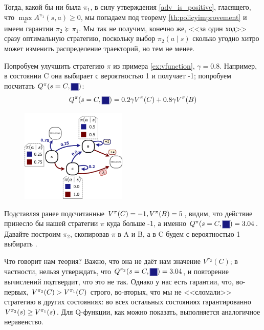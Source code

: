 Тогда, какой бы ни была $\pi_1$, в силу утверждения \ref{adv_is_positive}, гласящего, что $\max\limits_a A^{\pi_1}(s, a) \ge 0$, мы попадаем под теорему \ref{th:policyimprovement} и имеем гарантии $\pi_2 \succeq \pi_1$. Мы так не получим, конечно же, <<за один ход>> сразу оптимальную стратегию, поскольку выбор $\pi_2(a \mid s)$ сколько угодно хитро может изменить распределение траекторий, но тем не менее.

\begin{example}
Попробуем улучшить стратегию $\pi$ из примера \ref{ex:vfunction}, $\gamma = 0.8$. Например, в состоянии C она выбирает  с вероятностью 1 и получает -1; попробуем посчитать $Q^{\pi}(s \HM= C, \colorsquare{ChadBlue})$:
$$
Q^{\pi}(s = C, \colorsquare{ChadBlue}) = 0.2\gamma V^{\pi}(C) + 0.8 \gamma V^{\pi}(B)
$$
\begin{figure}
\vspace{-0.5cm}
\centering
\includegraphics[width=0.45\textwidth]{Images/Value.png}
\end{figure}
Подставляя ранее подсчитанные $V^{\pi}(C) \HM= -1, V^{\pi}(B) \HM= 5$, видим, что действие  принесло бы нашей стратегии $\pi$ куда больше -1, а именно $Q^{\pi}(s = C, \colorsquare{ChadBlue}) \HM= 3.04$. Давайте построим $\pi_2$, скопировав $\pi$ в A и B, а в C будем с вероятностью 1 выбирать .

Что говорит нам теория? Важно, что она не даёт нам значение $V^{\pi_2}(C)$; в частности, нельзя утверждать, что $Q^{\pi_2}(s = C, \colorsquare{ChadBlue}) \HM= 3.04$, и повторение вычислений подтвердит, что это не так. Однако у нас есть гарантии, что, во-первых, $V^{\pi_2}(C) \HM> V^{\pi_1}(C)$ строго, во-вторых, что мы не <<сломали>> стратегию в других состояниях: во всех остальных состояниях гарантированно $V^{\pi_2}(s) \HM\ge V^{\pi_1}(s)$. Для Q-функции, как можно показать, выполняется аналогичное неравенство.
\end{example}

